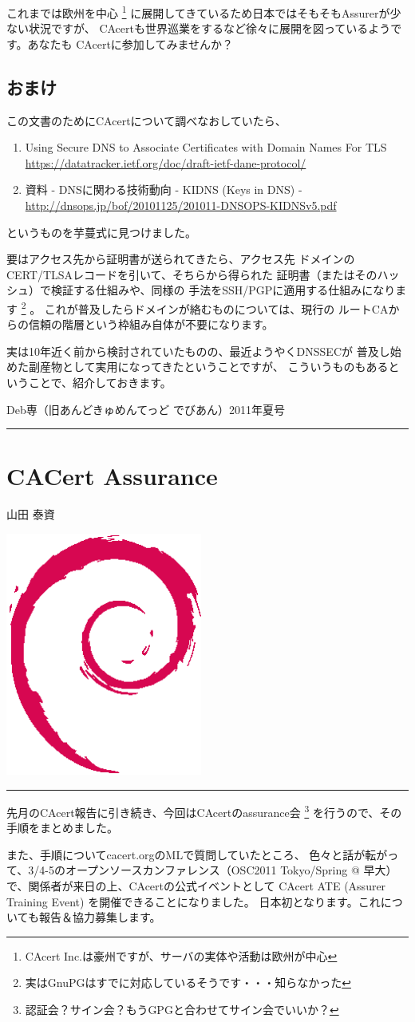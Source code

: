 \documentclass[mingoth,a4paper]{jsarticle}
\renewcommand{\dancersection}[2]{%
\newpage
Deb専（旧あんどきゅめんてっど でびあん）2011年夏号
%
\vspace{0.1mm}\\
{\color{dancerdarkblue}\rule{\hsize}{2mm}}

%
%
\begin{minipage}[t]{0.6\hsize}
\color{dancerdarkblue}
\vspace{1cm}
\section{#1}
\hfill{}#2\\
\end{minipage}
\begin{minipage}[t]{0.4\hsize}
\vspace{-2cm}
\hfill{}\includegraphics[height=8cm]{image200502/openlogo-nd.eps}\\
\vspace{-5cm}
\end{minipage}
%
{\color{dancerlightblue}\rule{0.66\hsize}{2mm}}
%
\vspace{2cm}
}
\begin{document}
これまでは欧州を中心
\footnote{CAcert Inc.は豪州ですが、サーバの実体や活動は欧州が中心}
に展開してきているため日本ではそもそもAssurerが少ない状況ですが、
CAcertも世界巡業をするなど徐々に展開を図っているようです。あなたも
CAcertに参加してみませんか？

\subsection{おまけ}
この文書のためにCAcertについて調べなおしていたら、
\begin{enumerate}
\item
Using Secure DNS to Associate Certificates with Domain Names For TLS\\
\url{https://datatracker.ietf.org/doc/draft-ietf-dane-protocol/}
\item
資料 - DNSに関わる技術動向 - KIDNS (Keys in DNS) -\\
\url{http://dnsops.jp/bof/20101125/201011-DNSOPS-KIDNSv5.pdf}
\end{enumerate}
というものを芋蔓式に見つけました。

要はアクセス先から証明書が送られてきたら、アクセス先
ドメインのCERT/TLSAレコードを引いて、そちらから得られた
証明書（またはそのハッシュ）で検証する仕組みや、同様の
手法をSSH/PGPに適用する仕組みになります
\footnote{実はGnuPGはすでに対応しているそうです・・・知らなかった}
。
これが普及したらドメインが絡むものについては、現行の
ルートCAからの信頼の階層という枠組み自体が不要になります。

実は10年近く前から検討されていたものの、最近ようやくDNSSECが
普及し始めた副産物として実用になってきたということですが、
こういうものもあるということで、紹介しておきます。

\dancersection{CACert Assurance}{山田 泰資}

先月のCAcert報告に引き続き、今回はCAcertのassurance会
\footnote{認証会？サイン会？もうGPGと合わせてサイン会でいいか？}
を行うので、その手順をまとめました。

また、手順についてcacert.orgのMLで質問していたところ、
色々と話が転がって、3/4-5のオープンソースカンファレンス（OSC2011
Tokyo/Spring @ 早大）で、関係者が来日の上、CAcertの公式イベントとして
CAcert ATE (Assurer Training Event) を開催できることになりました。
日本初となります。これについても報告＆協力募集します。
\end{document}
